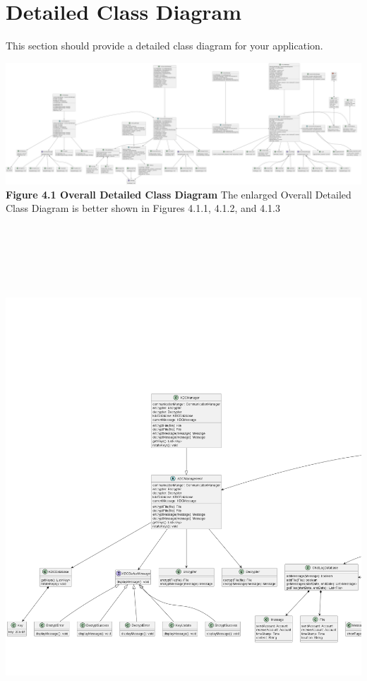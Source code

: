 \documentclass[]{article}
\begin{document}
\section{Detailed Class Diagram}
\label{sec:detailed_class_diagram}
This section should provide a detailed class diagram for your application.
\begin{center}
	\includegraphics[width=\textwidth]{../images/ClassDiagram/FullClass.png}
	\textbf{Figure 4.1 Overall Detailed Class Diagram}
	\newline The enlarged Overall Detailed Class Diagram is better shown in Figures 4.1.1, 4.1.2, and 4.1.3
	\includegraphics[width=\textwidth,height=8in]{../images/ClassDiagram/left.png}

\end{center}
\end{document}
